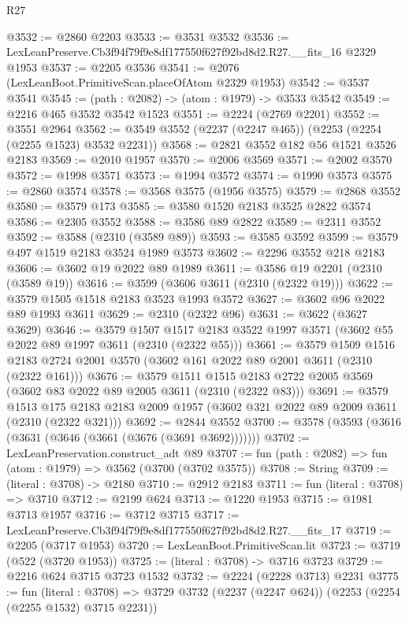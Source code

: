 \begin{lexlean}{R27}
\begin{coremodule}
@3532 := @2860 @2203
@3533 := @3531 @3532
@3536 := LexLeanPreserve.Cb3f94f79f9e8df177550f627f92bd8d2.R27.__fits_16 @2329 @1953
@3537 := @2205 @3536
@3541 := @2076 (LexLeanBoot.PrimitiveScan.placeOfAtom @2329 @1953)
@3542 := @3537 @3541
@3545 := (path : @2082) -> (atom : @1979) -> @3533 @3542
@3549 := @2216 @465 @3532 @3542 @1523
@3551 := @2224 (@2769 @2201)
@3552 := @3551 @2964
@3562 := @3549 @3552 (@2237 (@2247 @465)) (@2253 (@2254 (@2255 @1523) @3532 @2231))
@3568 := @2821 @3552 @182 @56 @1521 @3526 @2183
@3569 := @2010 @1957
@3570 := @2006 @3569
@3571 := @2002 @3570
@3572 := @1998 @3571
@3573 := @1994 @3572
@3574 := @1990 @3573
@3575 := @2860 @3574
@3578 := @3568 @3575 (@1956 @3575)
@3579 := @2868 @3552
@3580 := @3579 @173
@3585 := @3580 @1520 @2183 @3525 @2822 @3574
@3586 := @2305 @3552
@3588 := @3586 @89 @2822
@3589 := @2311 @3552
@3592 := @3588 (@2310 (@3589 @89))
@3593 := @3585 @3592
@3599 := @3579 @497 @1519 @2183 @3524 @1989 @3573
@3602 := @2296 @3552 @218 @2183
@3606 := @3602 @19 @2022 @89 @1989
@3611 := @3586 @19 @2201 (@2310 (@3589 @19))
@3616 := @3599 (@3606 @3611 (@2310 (@2322 @19)))
@3622 := @3579 @1505 @1518 @2183 @3523 @1993 @3572
@3627 := @3602 @96 @2022 @89 @1993 @3611
@3629 := @2310 (@2322 @96)
@3631 := @3622 (@3627 @3629)
@3646 := @3579
    @1507
    @1517
    @2183
    @3522
    @1997
    @3571
    (@3602 @55 @2022 @89 @1997 @3611 (@2310 (@2322 @55)))
@3661 := @3579
    @1509
    @1516
    @2183
    @2724
    @2001
    @3570
    (@3602 @161 @2022 @89 @2001 @3611 (@2310 (@2322 @161)))
@3676 := @3579
    @1511
    @1515
    @2183
    @2722
    @2005
    @3569
    (@3602 @83 @2022 @89 @2005 @3611 (@2310 (@2322 @83)))
@3691 := @3579
    @1513
    @175
    @2183
    @2183
    @2009
    @1957
    (@3602 @321 @2022 @89 @2009 @3611 (@2310 (@2322 @321)))
@3692 := @2844 @3552
@3700 := @3578 (@3593 (@3616 (@3631 (@3646 (@3661 (@3676 (@3691 @3692)))))))
@3702 := LexLeanPreservation.construct_adt @89
@3707 := fun (path : @2082) => fun (atom : @1979) => @3562 (@3700 (@3702 @3575))
@3708 := String
@3709 := (literal : @3708) -> @2180
@3710 := @2912 @2183
@3711 := fun (literal : @3708) => @3710
@3712 := @2199 @624
@3713 := @1220 @1953
@3715 := @1981 @3713 @1957
@3716 := @3712 @3715
@3717 := LexLeanPreserve.Cb3f94f79f9e8df177550f627f92bd8d2.R27.__fits_17
@3719 := @2205 (@3717 @1953)
@3720 := LexLeanBoot.PrimitiveScan.lit
@3723 := @3719 (@522 (@3720 @1953))
@3725 := (literal : @3708) -> @3716 @3723
@3729 := @2216 @624 @3715 @3723 @1532
@3732 := @2224 (@2228 @3713) @2231
@3775 := fun (literal : @3708) =>
  @3729
    @3732
    (@2237 (@2247 @624))
    (@2253 (@2254 (@2255 @1532) @3715 @2231))

\end{coremodule}
\end{lexlean}
